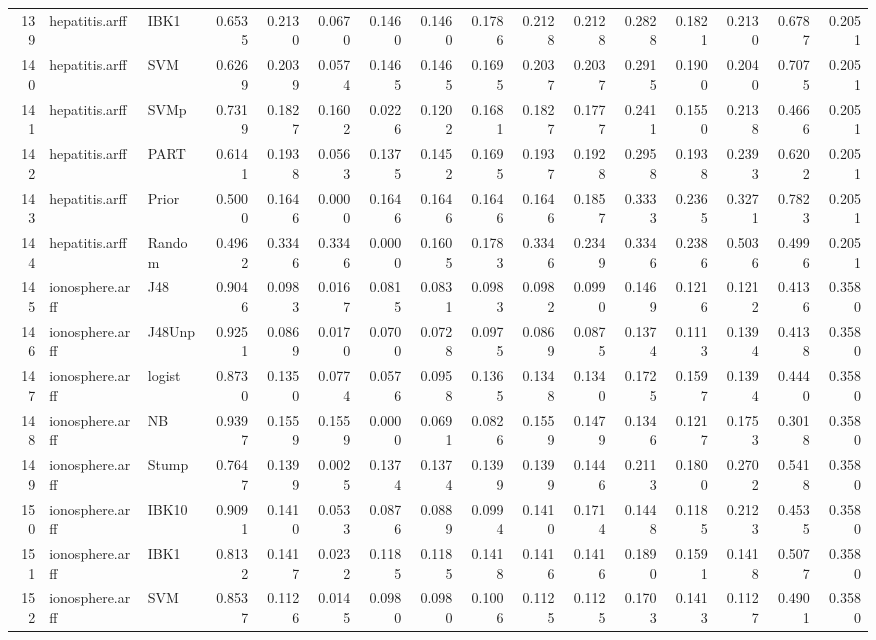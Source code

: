 \documentclass {article}
\begin{document}
\begin{table}[ht]
\begin{tabular}{rllrrrrrrrrrrrrr}
  139 & hepatitis.arff & IBK1 & 0.6535 & 0.2130 & 0.0670 & 0.1460 & 0.1460 & 0.1786 & 0.2128 & 0.2128 & 0.2828 & 0.1821 & 0.2130 & 0.6787 & 0.2051 \\ 
  140 & hepatitis.arff & SVM & 0.6269 & 0.2039 & 0.0574 & 0.1465 & 0.1465 & 0.1695 & 0.2037 & 0.2037 & 0.2915 & 0.1900 & 0.2040 & 0.7075 & 0.2051 \\ 
  141 & hepatitis.arff & SVMp & 0.7319 & 0.1827 & 0.1602 & 0.0226 & 0.1202 & 0.1681 & 0.1827 & 0.1777 & 0.2411 & 0.1550 & 0.2138 & 0.4666 & 0.2051 \\ 
  142 & hepatitis.arff & PART & 0.6141 & 0.1938 & 0.0563 & 0.1375 & 0.1452 & 0.1695 & 0.1937 & 0.1928 & 0.2958 & 0.1938 & 0.2393 & 0.6202 & 0.2051 \\ 
  143 & hepatitis.arff & Prior & 0.5000 & 0.1646 & 0.0000 & 0.1646 & 0.1646 & 0.1646 & 0.1646 & 0.1857 & 0.3333 & 0.2365 & 0.3271 & 0.7823 & 0.2051 \\ 
  144 & hepatitis.arff & Random & 0.4962 & 0.3346 & 0.3346 & 0.0000 & 0.1605 & 0.1783 & 0.3346 & 0.2349 & 0.3346 & 0.2386 & 0.5036 & 0.4996 & 0.2051 \\ 
  145 & ionosphere.arff & J48 & 0.9046 & 0.0983 & 0.0167 & 0.0815 & 0.0831 & 0.0983 & 0.0982 & 0.0990 & 0.1469 & 0.1216 & 0.1212 & 0.4136 & 0.3580 \\ 
  146 & ionosphere.arff & J48Unp & 0.9251 & 0.0869 & 0.0170 & 0.0700 & 0.0728 & 0.0975 & 0.0869 & 0.0875 & 0.1374 & 0.1113 & 0.1394 & 0.4138 & 0.3580 \\ 
  147 & ionosphere.arff & logist & 0.8730 & 0.1350 & 0.0774 & 0.0576 & 0.0958 & 0.1365 & 0.1348 & 0.1340 & 0.1725 & 0.1597 & 0.1394 & 0.4440 & 0.3580 \\ 
  148 & ionosphere.arff & NB & 0.9397 & 0.1559 & 0.1559 & 0.0000 & 0.0691 & 0.0826 & 0.1559 & 0.1479 & 0.1346 & 0.1217 & 0.1753 & 0.3018 & 0.3580 \\ 
  149 & ionosphere.arff & Stump & 0.7647 & 0.1399 & 0.0025 & 0.1374 & 0.1374 & 0.1399 & 0.1399 & 0.1446 & 0.2113 & 0.1800 & 0.2702 & 0.5418 & 0.3580 \\ 
  150 & ionosphere.arff & IBK10 & 0.9091 & 0.1410 & 0.0533 & 0.0876 & 0.0889 & 0.0994 & 0.1410 & 0.1714 & 0.1448 & 0.1185 & 0.2123 & 0.4535 & 0.3580 \\ 
  151 & ionosphere.arff & IBK1 & 0.8132 & 0.1417 & 0.0232 & 0.1185 & 0.1185 & 0.1418 & 0.1416 & 0.1416 & 0.1890 & 0.1591 & 0.1418 & 0.5077 & 0.3580 \\ 
  152 & ionosphere.arff & SVM & 0.8537 & 0.1126 & 0.0145 & 0.0980 & 0.0980 & 0.1006 & 0.1125 & 0.1125 & 0.1703 & 0.1413 & 0.1127 & 0.4901 & 0.3580 \\ 

\end{tabular}
\end{table}
\end{document}
